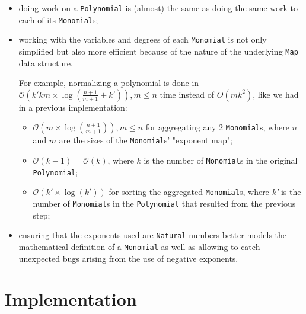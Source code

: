 \documentclass[11pt,a4paper]{article}
\begin{document}
\begin{itemize}
    \item doing work on a \lstinline{Polynomial} is (almost) the same as doing the same work to each of its \lstinline{Monomial}s;

    \item working with the variables and degrees of each \lstinline{Monomial} is not only simplified but also more efficient because of the nature of the underlying \lstinline{Map} data structure.

    For example, normalizing a polynomial is done in $ \mathcal{O} \left( k' k m \times \log \left( \frac{n+1}{m+1} + k' \right) \right), m \leq n $ time instead of $ O(m k^2) $, like we had in a previous implementation:
          \begin{itemize}
              \item $ \mathcal{O} \left( m \times \log \left( \frac{n+1}{m+1} \right) \right), m \leq n $ for aggregating any 2 \lstinline{Monomial}s, where $n$ and $m$ are the sizes of the \lstinline{Monomial}s' "exponent map";

              \item $ \mathcal{O} (k-1) = \mathcal{O} (k) $, where $k$ is the number of \lstinline{Monomial}s in the original \lstinline{Polynomial};

              \item $ \mathcal{O} (k' \times \log(k')) $ for sorting the aggregated \lstinline{Monomial}s, where \textit{k'} is the number of \lstinline{Monomial}s in the \lstinline{Polynomial} that resulted from the previous step;
          \end{itemize}

    \item ensuring that the exponents used are \lstinline{Natural} numbers better models the mathematical definition of a \lstinline{Monomial} as well as allowing to catch unexpected bugs arising from the use of negative exponents.

\end{itemize}

\pagebreak

\section{Implementation}
\end{document}
